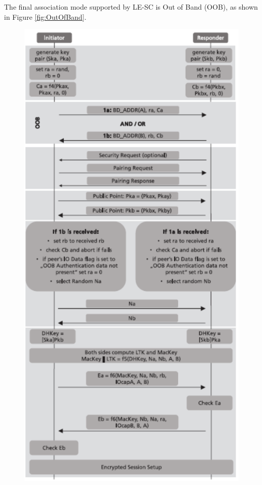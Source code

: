 \documentclass{Configuration_Files/PoliMi3i_thesis}
\begin{document}
The final association mode supported by LE-SC is Out of Band (OOB), as shown in Figure \ref{fig:OutOfBand}.

\begin{figure}[H]
    \centering
    \includegraphics[scale=0.7]{Bluetooth_Security/8.png}
    \label{fig:pairing_procedure}
\end{figure}
\end{document}
